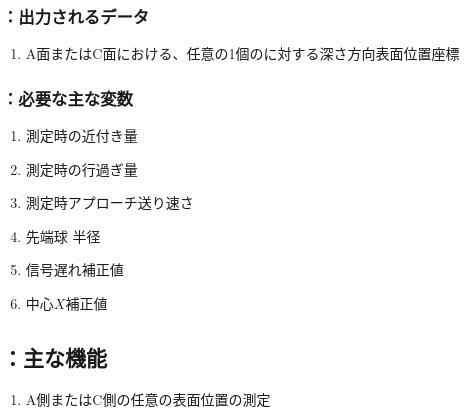 \subsubsection{\DMLthreeAC：出力されるデータ}
\begin{enumerate}[label*=\sarrow]
\item A面またはC面における、任意の1個の\Dimple に対する深さ方向表面位置座標
\end{enumerate}

\subsubsection{\DMLthreeAC：必要な主な変数}
\begin{enumerate}[label*=\sarrow]
\item \TouchSensorProbe 測定時の近付き量
\item \TouchSensorProbe 測定時の行過ぎ量
\item \TouchSensorProbe 測定時アプローチ送り速さ
\item \TouchSensorProbe 先端球 半径
\item \TouchSensorProbe 信号遅れ補正値
\item \TouchSensorProbe 中心$X$補正値
\end{enumerate}


\subsection{\DMLthreeAC：主な機能}
\begin{enumerate}[label*=\sarrow]
\item A側またはC側の任意の\Dimple 表面位置の測定
\end{enumerate}


